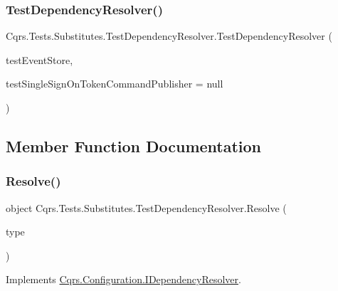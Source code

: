 \subsubsection{\texorpdfstring{Test\+Dependency\+Resolver()}{TestDependencyResolver()}}
{\footnotesize\ttfamily Cqrs.\+Tests.\+Substitutes.\+Test\+Dependency\+Resolver.\+Test\+Dependency\+Resolver (\begin{DoxyParamCaption}\item[{\hyperlink{classCqrs_1_1Tests_1_1Substitutes_1_1TestEventStore}{Test\+Event\+Store}}]{test\+Event\+Store,  }\item[{\hyperlink{interfaceCqrs_1_1Commands_1_1ICommandPublisher}{I\+Command\+Publisher}$<$ \hyperlink{interfaceCqrs_1_1Authentication_1_1ISingleSignOnToken}{I\+Single\+Sign\+On\+Token} $>$}]{test\+Single\+Sign\+On\+Token\+Command\+Publisher = {\ttfamily null} }\end{DoxyParamCaption})}



\subsection{Member Function Documentation}
\mbox{\label{classCqrs_1_1Tests_1_1Substitutes_1_1TestDependencyResolver_a05767824475ea6affbf6f70cf5b1fd06_a05767824475ea6affbf6f70cf5b1fd06}} 
\subsubsection{\texorpdfstring{Resolve()}{Resolve()}}
{\footnotesize\ttfamily object Cqrs.\+Tests.\+Substitutes.\+Test\+Dependency\+Resolver.\+Resolve (\begin{DoxyParamCaption}\item[{Type}]{type }\end{DoxyParamCaption})}



Implements \hyperlink{interfaceCqrs_1_1Configuration_1_1IDependencyResolver_aa455096b7b94fc1d64904bc67830ec06_aa455096b7b94fc1d64904bc67830ec06}{Cqrs.\+Configuration.\+I\+Dependency\+Resolver}.

